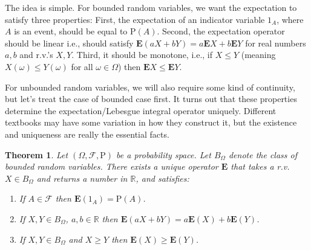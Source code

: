 \documentclass[11pt]{report}
\providecommand{\cal}{\mathcal}
\newcommand{\R}{\mathbb{R}}
\theoremstyle{plain}
\newtheorem{thm}{Theorem}[chapter]
\theoremstyle{definition}
\begin{document}
The idea is simple. For bounded random variables, we
want the expectation to satisfy three properties:
First, the expectation of an indicator variable $1_A$,
where $A$ is an event, should be equal to
$\mathrm{P}(A)$. Second, the expectation operator
should be linear i.e., should satisfy
$\mathbf{E}(aX+bY)=a\mathbf{E} X+b\mathbf{E} Y$ for
real numbers $a,b$ and r.v.'s $X,Y$. Third, it should
be monotone, i.e., if $X\le Y$ (meaning
$X(\omega)\le Y(\omega)$ for all $\omega\in \Omega$)
then $\mathbf{E} X\le \mathbf{E} Y$.

For unbounded random variables, we will also require
some kind of continuity, but let's treat the case of
bounded case first. It turns out that these properties
determine the expectation/Lebesgue integral operator
uniquely. Different textbooks may have some variation
in how they construct it, but the existence and
uniqueness are really the essential facts.

\begin{thm}
\label{thm-expecproperties}
Let $(\Omega, {\cal F}, \mathrm{P})$ be a probability
space. Let $B_\Omega$ denote the class of bounded
random variables. There exists a unique operator
$\mathbf{E}$ that takes a r.v. $X\in B_\Omega$ and
returns a number in $\R$, and satisfies:

\begin{enumerate}[label=\arabic*.]
\item If $A\in {\cal F}$ then
$\mathbf{E}(1_A) = \mathrm{P}(A)$.

\item If $X,Y\in B_\Omega$, $a,b\in\R$ then
$\mathbf{E}(aX+bY) = a\mathbf{E}(X)+b\mathbf{E}(Y)$.

\item If $X,Y\in B_\Omega$ and $X\ge Y$ then
$\mathbf{E}(X)\ge \mathbf{E}(Y)$.
\end{enumerate}

\end{thm}
\end{document}
